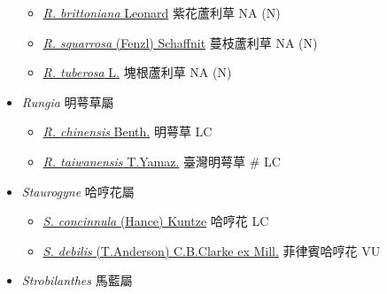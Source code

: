 \begin{itemize}
  \begin{itemize}
        \item[] \href{http://www.theplantlist.org/tpl1.1/search?q=Ruellia+brittoniana}{\textit{R. brittoniana} Leonard}   紫花蘆利草   NA (N)
        \item[] \href{http://www.theplantlist.org/tpl1.1/search?q=Ruellia+squarrosa}{\textit{R. squarrosa} (Fenzl) Schaffnit}   蔓枝蘆利草   NA (N)
        \item[] \href{http://www.theplantlist.org/tpl1.1/search?q=Ruellia+tuberosa}{\textit{R. tuberosa} L.}   塊根蘆利草   NA (N)
  \end{itemize}
 \item[] \textit{Rungia} 明萼草屬
                                
  \begin{itemize}
        \item[] \href{http://www.theplantlist.org/tpl1.1/search?q=Rungia+chinensis}{\textit{R. chinensis} Benth.}   明萼草   LC
        \item[] \href{http://www.theplantlist.org/tpl1.1/search?q=Rungia+taiwanensis}{\textit{R. taiwanensis} T.Yamaz.}   臺灣明萼草  \# LC
  \end{itemize}
 \item[] \textit{Staurogyne} 哈哼花屬
                                
  \begin{itemize}
        \item[] \href{http://www.theplantlist.org/tpl1.1/search?q=Staurogyne+concinnula}{\textit{S. concinnula} (Hance) Kuntze}   哈哼花   LC
        \item[] \href{http://www.theplantlist.org/tpl1.1/search?q=Staurogyne+debilis}{\textit{S. debilis} (T.Anderson) C.B.Clarke ex Mill.}   菲律賓哈哼花   VU
  \end{itemize}
 \item[] \textit{Strobilanthes} 馬藍屬
                                

\end{itemize}

